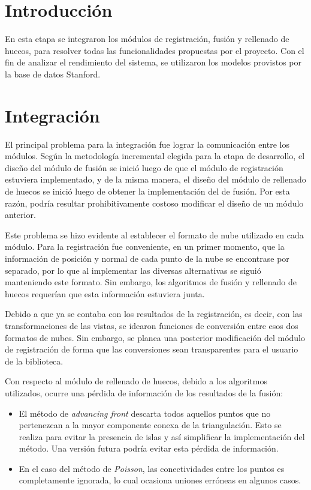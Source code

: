 	\section{Introducción}
	En esta etapa se integraron los módulos de registración, fusión y rellenado de huecos,
	para resolver todas las funcionalidades propuestas por el proyecto.
	Con el fin de analizar el rendimiento del sistema,
	se utilizaron los modelos provistos por la base de datos Stanford.

	\section{Integración}
		El principal problema para la integración fue lograr la comunicación
		entre los módulos.  Según la metodología incremental elegida para la
		etapa de desarrollo, el diseño del módulo de fusión se inició luego de
		que el módulo de registración estuviera implementado, y de la misma
		manera, el diseño del módulo de rellenado de huecos se inició luego de
		obtener la implementación del de fusión. 
		Por esta razón, podría resultar prohibitivamente costoso modificar el diseño de un módulo anterior.

		Este problema se hizo evidente al establecer el formato de nube utilizado en cada módulo.
		Para la registración fue conveniente, en un primer momento,
		que la información de posición y normal de cada punto de la nube se encontrase por separado,
		por lo que al implementar las diversas alternativas se siguió manteniendo este formato.
		Sin embargo, los algoritmos de fusión y rellenado de huecos requerían
		que esta información estuviera junta.

		Debido a que ya se contaba con los resultados de la registración, es
		decir, con las transformaciones de las vistas, se idearon funciones de
		conversión entre esos dos formatos de nubes.
		Sin embargo, se planea una posterior modificación del módulo de registración de
		forma que las conversiones sean transparentes para el usuario de la
		biblioteca.

		Con respecto al módulo de rellenado de huecos, debido a los algoritmos
		utilizados, ocurre una pérdida de información de los resultados de la
		fusión:
		\begin{itemize}
			\item El método de \emph{advancing front} descarta todos aquellos
				puntos que no pertenezcan a la mayor componente conexa de la
				triangulación. Esto se realiza para evitar la presencia de islas y así
				simplificar la implementación del método.
				Una versión futura podría evitar esta pérdida de información.

			\item En el caso del método de \emph{Poisson}, las conectividades entre los
				puntos es completamente ignorada, lo cual ocasiona uniones erróneas en algunos casos.
		\end{itemize}


